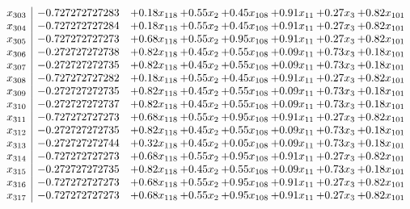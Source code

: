 \documentclass[8pt]{article}
\begin{document}
\[\begin{array}{c| c c@{\hskip 2pt} c@{\hskip 2pt} c@{\hskip 2pt} c@{\hskip 2pt} c@{\hskip 2pt} c@{\hskip 2pt} }
 x_{303}   &  -0.727272727283 & +  0.18 x_{118} & +  0.55 x_{2} & +  0.45 x_{108} & +  0.91 x_{11} & +  0.27 x_{3} & +  0.82 x_{101}\\
 x_{304}   &  -0.727272727284 & +  0.18 x_{118} & +  0.55 x_{2} & +  0.45 x_{108} & +  0.91 x_{11} & +  0.27 x_{3} & +  0.82 x_{101}\\
 x_{305}   &  -0.727272727273 & +  0.68 x_{118} & +  0.55 x_{2} & +  0.95 x_{108} & +  0.91 x_{11} & +  0.27 x_{3} & +  0.82 x_{101}\\
 x_{306}   &  -0.272727272738 & +  0.82 x_{118} & +  0.45 x_{2} & +  0.55 x_{108} & +  0.09 x_{11} & +  0.73 x_{3} & +  0.18 x_{101}\\
 x_{307}   &  -0.272727272735 & +  0.82 x_{118} & +  0.45 x_{2} & +  0.55 x_{108} & +  0.09 x_{11} & +  0.73 x_{3} & +  0.18 x_{101}\\
 x_{308}   &  -0.727272727282 & +  0.18 x_{118} & +  0.55 x_{2} & +  0.45 x_{108} & +  0.91 x_{11} & +  0.27 x_{3} & +  0.82 x_{101}\\
 x_{309}   &  -0.272727272735 & +  0.82 x_{118} & +  0.45 x_{2} & +  0.55 x_{108} & +  0.09 x_{11} & +  0.73 x_{3} & +  0.18 x_{101}\\
 x_{310}   &  -0.272727272737 & +  0.82 x_{118} & +  0.45 x_{2} & +  0.55 x_{108} & +  0.09 x_{11} & +  0.73 x_{3} & +  0.18 x_{101}\\
 x_{311}   &  -0.727272727273 & +  0.68 x_{118} & +  0.55 x_{2} & +  0.95 x_{108} & +  0.91 x_{11} & +  0.27 x_{3} & +  0.82 x_{101}\\
 x_{312}   &  -0.272727272735 & +  0.82 x_{118} & +  0.45 x_{2} & +  0.55 x_{108} & +  0.09 x_{11} & +  0.73 x_{3} & +  0.18 x_{101}\\
 x_{313}   &  -0.272727272744 & +  0.32 x_{118} & +  0.45 x_{2} & +  0.05 x_{108} & +  0.09 x_{11} & +  0.73 x_{3} & +  0.18 x_{101}\\
 x_{314}   &  -0.727272727273 & +  0.68 x_{118} & +  0.55 x_{2} & +  0.95 x_{108} & +  0.91 x_{11} & +  0.27 x_{3} & +  0.82 x_{101}\\
 x_{315}   &  -0.272727272735 & +  0.82 x_{118} & +  0.45 x_{2} & +  0.55 x_{108} & +  0.09 x_{11} & +  0.73 x_{3} & +  0.18 x_{101}\\
 x_{316}   &  -0.727272727273 & +  0.68 x_{118} & +  0.55 x_{2} & +  0.95 x_{108} & +  0.91 x_{11} & +  0.27 x_{3} & +  0.82 x_{101}\\
 x_{317}   &  -0.727272727273 & +  0.68 x_{118} & +  0.55 x_{2} & +  0.95 x_{108} & +  0.91 x_{11} & +  0.27 x_{3} & +  0.82 x_{101}\\

\end{array}\]
\end{document}
